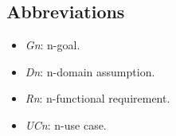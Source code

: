 \subsection{Abbreviations}
	\begin{itemize}
   	\item \textit{Gn}: n-goal. 
   	\item \textit{Dn}: n-domain assumption.
   	\item \textit{Rn}: n-functional requirement. 
   	\item \textit{UCn}: n-use case.
	\end{itemize}